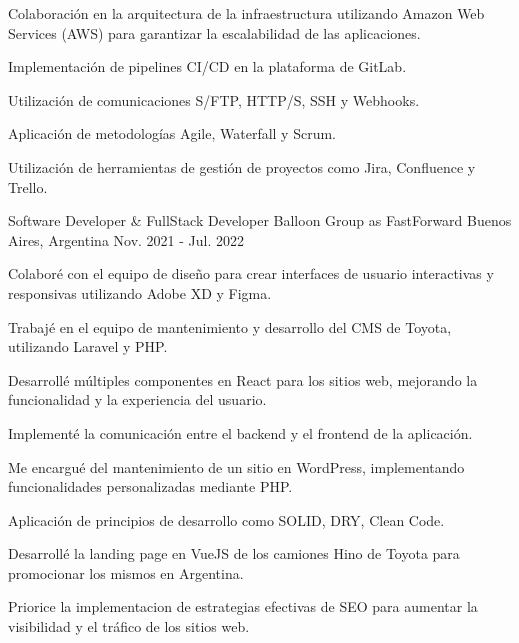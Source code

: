 \begin{cventries}
{\begin{cvitems}
        \item {Colaboración en la arquitectura de la infraestructura utilizando Amazon Web Services (AWS) para garantizar la escalabilidad de las aplicaciones.}
        \item {Implementación de pipelines CI/CD en la plataforma de GitLab.}
        \item {Utilización de comunicaciones S/FTP, HTTP/S, SSH y Webhooks.}
        \item {Aplicación de metodologías Agile, Waterfall y Scrum.}
        \item {Utilización de herramientas de gestión de proyectos como Jira, Confluence y Trello.}
      \end{cvitems}
    }
  \vspace{5.5mm}
  \cventry
    {Software Developer \& FullStack Developer} %
    {Balloon Group as FastForward} %
    {Buenos Aires, Argentina} %
    {Nov. 2021 - Jul. 2022} %
    {
      \begin{cvitems} %
        \item {Colaboré con el equipo de diseño para crear interfaces de usuario interactivas y responsivas utilizando Adobe XD y Figma.}
        \item {Trabajé en el equipo de mantenimiento y desarrollo del CMS de Toyota, utilizando Laravel y PHP.}
        \item {Desarrollé múltiples componentes en React para los sitios web, mejorando la funcionalidad y la experiencia del usuario.}
        \item {Implementé la comunicación entre el backend y el frontend de la aplicación.}
        \item {Me encargué del mantenimiento de un sitio en WordPress, implementando funcionalidades personalizadas mediante PHP.}
        \item {Aplicación de principios de desarrollo como SOLID, DRY, Clean Code.}
        \item {Desarrollé la landing page en VueJS de los camiones Hino de Toyota para promocionar los mismos en Argentina.}
        \item { Priorice la implementacion de estrategias efectivas de SEO para aumentar la visibilidad y el tráfico de los sitios web.}
      \end{cvitems}
    }
  \vspace{5.5mm}

\end{cventries}
